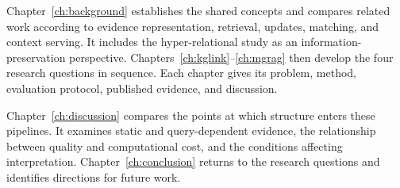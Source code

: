 Chapter~\ref{ch:background} establishes the shared concepts and compares related work according to evidence representation, retrieval, updates, matching, and context serving. It includes the hyper-relational study as an information-preservation perspective. Chapters~\ref{ch:kglink}--\ref{ch:mgrag} then develop the four research questions in sequence. Each chapter gives its problem, method, evaluation protocol, published evidence, and discussion.

Chapter~\ref{ch:discussion} compares the points at which structure enters these pipelines. It examines static and query-dependent evidence, the relationship between quality and computational cost, and the conditions affecting interpretation. Chapter~\ref{ch:conclusion} returns to the research questions and identifies directions for future work.
